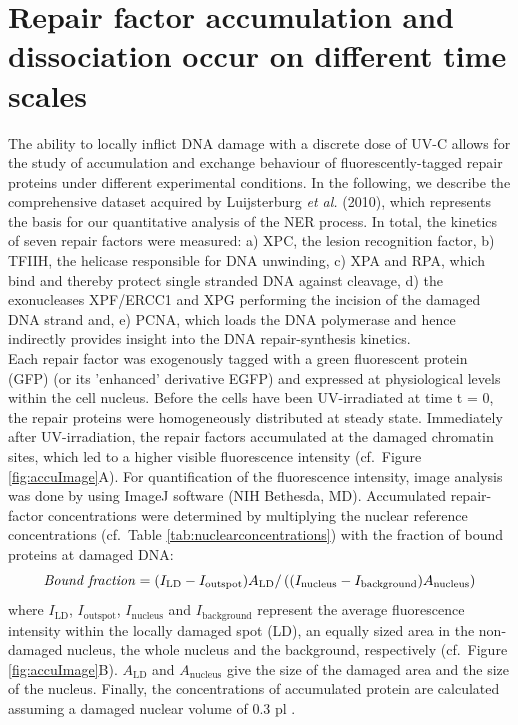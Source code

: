 \section{Repair factor accumulation and dissociation occur on different time scales}
\label{subsec:AccuFlipExp}
The ability to locally inflict DNA damage with a discrete dose of UV-C allows for the study of accumulation and exchange behaviour of fluorescently-tagged repair proteins under different experimental conditions. In the following, we describe the comprehensive dataset acquired by Luijsterburg \textit{et al.} (2010)\cite{Luijsterburg2010}, which represents the basis for our quantitative analysis of the NER process. In total, the kinetics of seven repair factors were measured: a) XPC, the lesion recognition factor, b) TFIIH, the helicase responsible for DNA unwinding, c) XPA and RPA, which bind and thereby protect single stranded DNA against cleavage, d) the exonucleases XPF/ERCC1 and XPG performing the incision of the damaged DNA strand and, e) PCNA, which loads the DNA polymerase and hence indirectly provides insight into the DNA repair-synthesis kinetics. \\
Each repair factor was exogenously tagged with a green fluorescent protein (GFP) (or its 'enhanced' derivative EGFP) and expressed at physiological levels within the cell nucleus. Before the cells have been UV-irradiated at time t = 0, the repair proteins were homogeneously distributed at steady state. Immediately after UV-irradiation, the repair factors accumulated at the damaged chromatin sites, which led to a higher visible fluorescence intensity (cf.\ Figure \ref{fig:accuImage}A). For quantification of the fluorescence intensity, image analysis was done by using ImageJ software (NIH Bethesda, MD). Accumulated repair-factor concentrations were determined by multiplying the nuclear reference concentrations (cf.\ Table \ref{tab:nuclearconcentrations}) with the fraction of bound proteins at damaged DNA:
%
%
\begin{equation}
\text{\textit{Bound fraction}} = (I_\text{LD} - I_\text{outspot})A_\text{LD}/ \left((I_\text{nucleus} - I_\text{background})A_\text{nucleus}\right)
\label{Eqn:BoundFraction}
\end{equation}     
where $I_\text{LD}$, $I_\text{outspot}$, $I_\text{nucleus}$ and $I_\text{background}$ represent the average fluorescence intensity within the locally damaged spot (LD), an equally sized area in the non-damaged nucleus, the whole nucleus and the background, respectively (cf.\ Figure \ref{fig:accuImage}B). $A_\text{LD}$ and $A_\text{nucleus}$ give the size of the damaged area and the size of the nucleus. Finally, the concentrations of accumulated protein are calculated assuming a damaged nuclear volume of 0.3 pl \cite{Luijsterburg2010}.\\    

